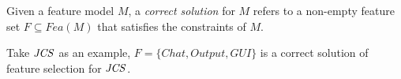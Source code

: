 

\vspace{-1mm}
\begin{myDef} 
Given a feature model $M$,  a \emph{correct solution}   for $M$ refers to a non-empty feature set $F \subseteq Fea(M)$ that satisfies the constraints of $M$.
\end{myDef}
\vspace{-1mm}

Take $\mathit{JCS}$ as an example, $F=\{\mathit{Chat},\mathit{Output}, \mathit{GUI}\}$ is a correct solution of feature selection for $\mathit{JCS}$. %





